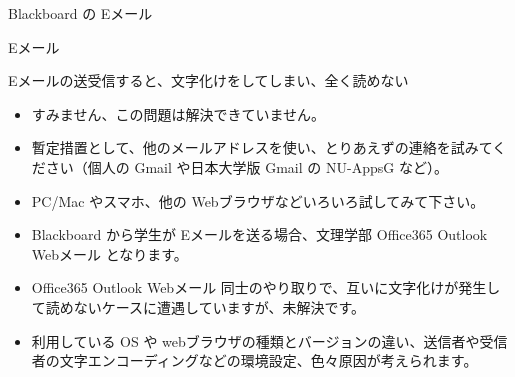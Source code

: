 \documentclass[a4j,10pt]{jsarticle}
\def\lthtmlcheckvsize{\ifdim\ht\sizebox<\vsize 
  \ifdim\wd\sizebox<\hsize\expandafter\hfill\fi \expandafter\vfill
  \else\expandafter\vss\fi}%
\begin{document}
{\begin{frame}[label={sec:orgff2a9df},fragile]{Blackboard の Eメール}
\begin{block}{Eメール}
\begin{block}{Eメールの送受信すると、文字化けをしてしまい、全く読めない}
\begin{itemize}
\item すみません、この問題は解決できていません。
\item 暫定措置として、他のメールアドレスを使い、とりあえずの連絡を試みてください（個人の Gmail や日本大学版 Gmail の NU-AppsG など）。
\item PC/Mac やスマホ、他の Webブラウザなどいろいろ試してみて下さい。
\par
\item Blackboard から学生が Eメールを送る場合、文理学部 Office365 Outlook Webメール となります。
\item Office365 Outlook Webメール 同士のやり取りで、互いに文字化けが発生して読めないケースに遭遇していますが、未解決です。
\par
\item 利用している OS や webブラウザの種類とバージョンの違い、送信者や受信者の文字エンコーディングなどの環境設定、色々原因が考えられます。
\end{itemize}
\end{block}
\end{block}
\end{frame}%
\lthtmlfigureZ
\lthtmlcheckvsize\clearpage}
\end{document}
